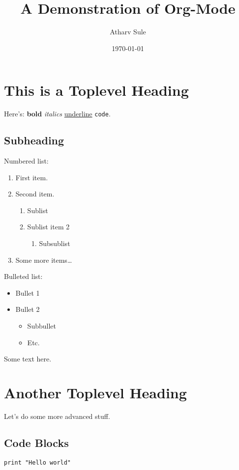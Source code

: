 \documentclass[11pt]{article}
\author{Atharv Sule}
\date{\today}
\title{A Demonstration of Org-Mode}
\begin{document}
\maketitle

\section{This is a Toplevel Heading}
\label{sec:orgf375fe8}

Here's: \textbf{bold} \emph{italics} \uline{underline} \texttt{code}.

\subsection{Subheading}
\label{sec:orga80302b}

Numbered list:
\begin{enumerate}
\item First item.
\item Second item.
\begin{enumerate}
\item Sublist
\item Sublist item 2
\begin{enumerate}
\item Subsublist
\end{enumerate}
\end{enumerate}
\item Some more items\ldots{}
\end{enumerate}

Bulleted list:
\begin{itemize}
\item Bullet 1
\item Bullet 2
\begin{itemize}
\item Subbullet
\item Etc.
\end{itemize}
\end{itemize}

Some text here.

\newpage

\section{Another Toplevel Heading}
\label{sec:org7522b87}
Let's do some more advanced stuff.

\subsection{Code Blocks}
\label{sec:org0a61a14}
\begin{verbatim}
print "Hello world"
\end{verbatim}
\end{document}
